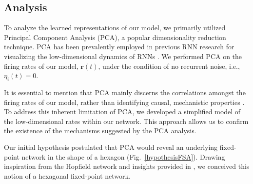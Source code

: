 \documentclass[conference]{IEEEtran}
\begin{document}
\subsection{Analysis}
\label{analysismodel}

To analyze the learned representations of our model, we primarily utilized Principal Component Analysis (PCA), a popular dimensionality reduction technique. PCA has been prevalently employed in previous RNN research for visualizing the low-dimensional dynamics of RNNs \cite{sussillo2013opening,mante2013context,driscoll2022flexible,kay2022neural}. We performed PCA on the firing rates of our model, $\textbf{r}(t)$, under the condition of no recurrent noise, i.e., $\eta_i(t)=0$.

It is essential to mention that PCA mainly discerns the correlations amongst the firing rates of our model, rather than identifying causal, mechanistic properties \cite{langdon2022latent}. To address this inherent limitation of PCA, we developed a simplified model of the low-dimensional rates within our network. This approach allows us to confirm the existence of the mechanisms suggested by the PCA analysis.

Our initial hypothesis postulated that PCA would reveal an underlying fixed-point network in the shape of a hexagon (Fig.~\ref{hypothesisFSA}). Drawing inspiration from the Hopfield network \cite{b27} and insights provided in \cite{chaisangmongkon2017computing}, we conceived this notion of a hexagonal fixed-point network.
\end{document}
